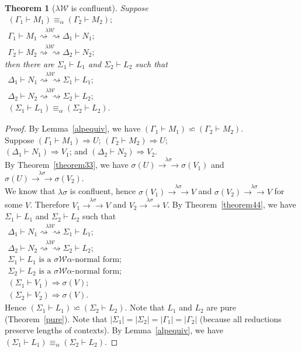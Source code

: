 \documentclass[11pt]{amsart}
\theoremstyle{plain}
\newtheorem{theorem}{Theorem}[section]
\theoremstyle{definition}
\theoremstyle{remark}
\numberwithin{equation}{section}
\newcommand{\ri}{\rightsquigarrow}
\newcommand{\arrow}{\rightarrow}
\newcommand{\twoh}{\arrow\arrow}
\newcommand{\alp}{\equiv_{\alpha}}
\renewcommand{\pi}{\mathcal{W}}
\begin{document}
\begin{theorem}[$\lambda\pi$ is confluent]
Suppose\\
$\begin{array}{l}
 (\Gamma_1\vdash M_1)\alp(\Gamma_2\vdash M_2);\\
 \Gamma_1\vdash M_1\overset{\lambda\pi}{\ri\ri}\Delta_1\vdash N_1;\\
 \Gamma_2\vdash
M_2\overset{\lambda\pi}{\ri\ri}\Delta_2\vdash N_2;
\end{array}$\\
then there are $\Sigma_1\vdash L_1$ and $\Sigma_2\vdash L_2$ such
that\\
$\begin{array}{l}  \Delta_1\vdash
N_1\overset{\lambda\pi}{\ri\ri}\Sigma_1\vdash
L_1;\\
 \Delta_2\vdash N_2\overset{\lambda\pi}{\ri\ri}\Sigma_2\vdash L_2;\\
 (\Sigma_1\vdash L_1)\alp(\Sigma_2\vdash L_2).
\end{array}$
\end{theorem}
\begin{proof}By Lemma~\ref{alpequiv}, we have $(\Gamma_1\vdash M_1)\backsimeq(\Gamma_2\vdash M_2)$.\\ Suppose
$(\Gamma_1\vdash M_1)\boldsymbol{\Rightarrow}U$;
$(\Gamma_2\vdash M_2)\boldsymbol{\Rightarrow}U$;\\
$(\Delta_1\vdash N_1)\boldsymbol{\Rightarrow}V_1$; and
$(\Delta_2\vdash N_2)\boldsymbol{\Rightarrow}V_2$.\\
 By
Theorem~\ref{theorem33}, we have
$\sigma(U)\overset{\lambda\sigma}{\twoh} \sigma(V_1)$ and
$\sigma(U)\overset{\lambda\sigma}{\twoh} \sigma(V_2)$.\\  We know
that $\lambda\sigma$ is confluent, hence
$\sigma(V_1)\overset{\lambda\sigma}{\twoh} V$ and
 $\sigma(V_2)\overset{\lambda\sigma}{\twoh} V$ for
some $V$. Therefore $V_1\overset{\lambda\sigma}{\twoh} V$ and
$V_2\overset{\lambda\sigma}{\twoh} V$. By Theorem~\ref{theorem44},
we have $\Sigma_1\vdash L_1$ and
$\Sigma_2\vdash L_2$ such that\\
$\begin{array}{l}  \Delta_1\vdash
N_1\overset{\lambda\pi}{\ri\ri}\Sigma_1\vdash
L_1;\\
 \Delta_2\vdash N_2\overset{\lambda\pi}{\ri\ri}\Sigma_2\vdash L_2;\\
 \Sigma_1\vdash L_1 \text{ is a $\sigma\pi\alpha$-normal form};\\
\Sigma_2\vdash L_2 \text{ is a $\sigma\pi\alpha$-normal form};\\
(\Sigma_1\vdash V_1)\boldsymbol{\Rightarrow}\sigma(V);\\
(\Sigma_2\vdash V_2)\boldsymbol{\Rightarrow}\sigma(V).
\end{array}$\\[5pt]
Hence  $(\Sigma_1\vdash L_1)\backsimeq(\Sigma_2\vdash L_2)$. Note
that $L_1$ and $L_2$ are pure (Theorem~\ref{pure}). Note that
$|\Sigma_1|=|\Sigma_2|=|\Gamma_1|=|\Gamma_2|$ (because all
reductions preserve lengths of contexts). By Lemma~\ref{alpequiv},
we have\\
 $(\Sigma_1\vdash L_1)\alp(\Sigma_2\vdash L_2)$.
\end{proof}
\end{document}
